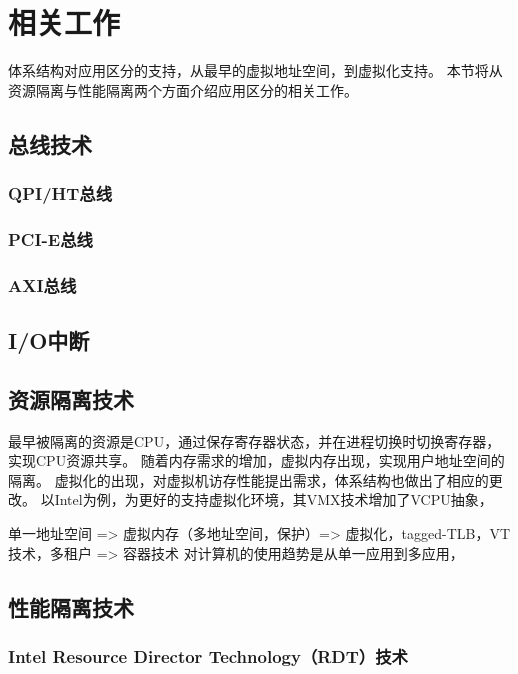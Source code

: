 \section{相关工作}

体系结构对应用区分的支持，从最早的虚拟地址空间，到虚拟化支持。
本节将从资源隔离与性能隔离两个方面介绍应用区分的相关工作。


\subsection{总线技术}

\subsubsection*{QPI/HT总线}

\subsubsection*{PCI-E总线}

\subsubsection*{AXI总线}

\subsection{I/O中断}

\subsection{资源隔离技术}


最早被隔离的资源是CPU，通过保存寄存器状态，并在进程切换时切换寄存器，实现CPU资源共享。
随着内存需求的增加，虚拟内存出现，实现用户地址空间的隔离。
虚拟化的出现，对虚拟机访存性能提出需求，体系结构也做出了相应的更改。
以Intel为例，为更好的支持虚拟化环境，其VMX技术增加了VCPU抽象，

单一地址空间 => 虚拟内存（多地址空间，保护）=> 虚拟化，tagged-TLB，VT技术，多租户
                                            => 容器技术
对计算机的使用趋势是从单一应用到多应用，

\subsection{性能隔离技术}

\subsubsection*{Intel Resource Director Technology（RDT）技术}

